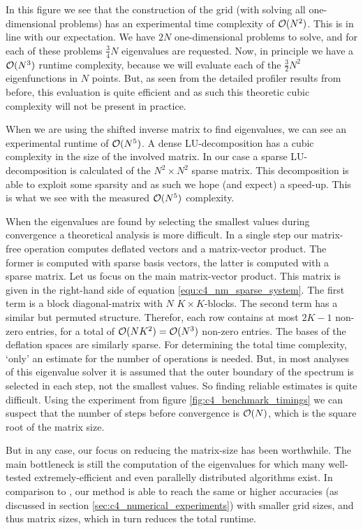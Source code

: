 In this figure we see that the construction of the grid (with solving all one-dimensional problems) has an experimental time complexity of $\operatorname{\mathcal{O}}(N^2)$. This is in line with our expectation. We have $2 N$ one-dimensional problems to solve, and for each of these problems $\frac{3}{4}N$ eigenvalues are requested. Now, in principle we have a $\operatorname{\mathcal{O}}(N^3)$ runtime complexity, because we will evaluate each of the $\frac{3}{2} N^2$ eigenfunctions in $N$ points. But, as seen from the detailed profiler results from before, this evaluation is quite efficient and as such this theoretic cubic complexity will not be present in practice.

When we are using the shifted inverse matrix to find eigenvalues, we can see an experimental runtime of $\operatorname{\mathcal{O}}(N^5)$. A dense LU-decomposition has a cubic complexity in the size of the involved matrix. In our case a sparse LU-decomposition is calculated of the $N^2 \times N^2$ sparse matrix. This decomposition is able to exploit some sparsity and as such we hope (and expect) a speed-up. This is what we see with the measured $\operatorname{\mathcal{O}}(N^5)$ complexity.

When the eigenvalues are found by selecting the smallest values during convergence a theoretical analysis is more difficult. In a single step our matrix-free operation computes deflated vectors and a matrix-vector product. The former is computed with sparse basis vectors, the latter is computed with a sparse matrix. Let us focus on the main matrix-vector product. This matrix is given in the right-hand side of equation \eqref{equ:c4_nm_sparse_system}. The first term is a block diagonal-matrix with $N$ $K\times K$-blocks. The second term has a similar but permuted structure. Therefor, each row contains at most $2K - 1$ non-zero entries, for a total of $\operatorname{\mathcal{O}}(N K^2) = \operatorname{\mathcal{O}}(N^3)$ non-zero entries. The bases of the deflation spaces are similarly sparse. For determining the total time complexity, `only' an estimate for the number of operations is needed. But, in most analyses of this eigenvalue solver it is assumed that the outer boundary of the spectrum is selected in each step, not the smallest values. So finding reliable estimates is quite difficult. Using the experiment from figure \ref{fig:c4_benchmark_timings} we can suspect that the number of steps before convergence is $\operatorname{\mathcal{O}}(N)$, which is the square root of the matrix size.

But in any case, our focus on reducing the matrix-size has been worthwhile. The main bottleneck is still the computation of the eigenvalues for which many well-tested extremely-efficient and even parallelly distributed algorithms exist. In comparison to \cite{wang_new_2009}, our method is able to reach the same or higher accuracies (as discussed in section \ref{sec:c4_numerical_experiments}) with smaller grid sizes, and thus matrix sizes, which in turn reduces the total runtime.

